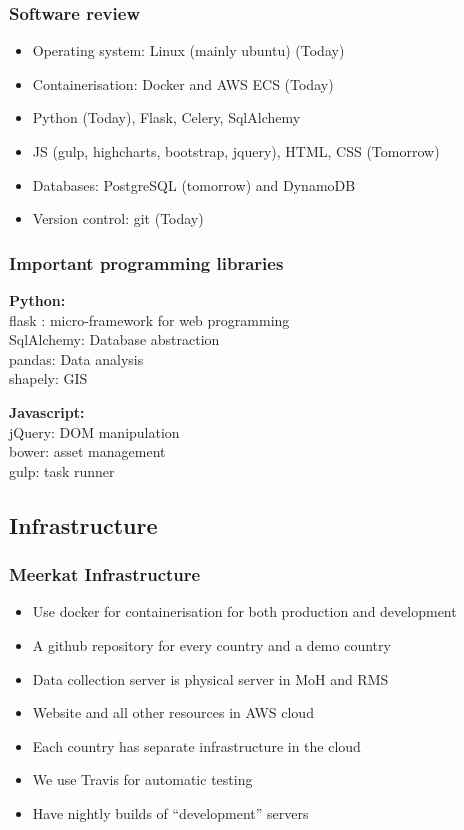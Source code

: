 \documentclass{beamer}
\begin{document}
\begin{frame}
  \frametitle{Software review}
  \begin{itemize}
  \item Operating system: Linux (mainly ubuntu) (Today)
  \item Containerisation: Docker and AWS ECS (Today)
  \item Python (Today), Flask, Celery, SqlAlchemy
  \item JS (gulp, highcharts, bootstrap, jquery), HTML, CSS (Tomorrow)
  \item Databases: PostgreSQL (tomorrow) and DynamoDB 
  \item Version control: git (Today)
  \end{itemize}
\end{frame}
\begin{frame}
  \frametitle{Important programming libraries}
  {\bf Python:} \\
  flask : micro-framework for web programming \\
  SqlAlchemy: Database abstraction \\
  pandas: Data analysis \\
  shapely: GIS \\

  \vspace{10pt}

  {\bf Javascript:} \\
  jQuery: DOM manipulation \\
  bower: asset management \\
  gulp: task runner \\
  
\end{frame}

\subsection{Infrastructure}
\begin{frame}
  \frametitle{Meerkat Infrastructure}
  \begin{itemize}
  \item Use docker for containerisation for both production and development
  \item A github repository for every country and a demo country
  \item Data collection server is physical server in MoH and RMS
  \item Website and all other resources in AWS cloud
  \item Each country has separate infrastructure in the cloud
  \item We use Travis for automatic testing
  \item Have nightly builds of ``development'' servers
  \end{itemize}
\end{frame}
\end{document}
